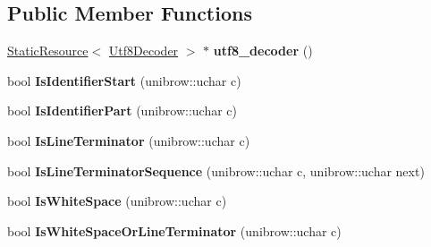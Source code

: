 \subsection*{Public Member Functions}
\begin{DoxyCompactItemize}
\item 
\hyperlink{classv8_1_1internal_1_1_static_resource}{Static\+Resource}$<$ \hyperlink{classunibrow_1_1_utf8_decoder}{Utf8\+Decoder} $>$ $\ast$ {\bfseries utf8\+\_\+decoder} ()\hypertarget{classv8_1_1internal_1_1_unicode_cache_a7cb5b1e10aabf0f2cfeb19ea98d21ef5}{}\label{classv8_1_1internal_1_1_unicode_cache_a7cb5b1e10aabf0f2cfeb19ea98d21ef5}

\item 
bool {\bfseries Is\+Identifier\+Start} (unibrow\+::uchar c)\hypertarget{classv8_1_1internal_1_1_unicode_cache_a63de14e7920c22f85edaa4b09184d110}{}\label{classv8_1_1internal_1_1_unicode_cache_a63de14e7920c22f85edaa4b09184d110}

\item 
bool {\bfseries Is\+Identifier\+Part} (unibrow\+::uchar c)\hypertarget{classv8_1_1internal_1_1_unicode_cache_a13c172d7080d40693cb3a130cad8d599}{}\label{classv8_1_1internal_1_1_unicode_cache_a13c172d7080d40693cb3a130cad8d599}

\item 
bool {\bfseries Is\+Line\+Terminator} (unibrow\+::uchar c)\hypertarget{classv8_1_1internal_1_1_unicode_cache_a3c47629a8b6d7eb07c0b30466ec4f62a}{}\label{classv8_1_1internal_1_1_unicode_cache_a3c47629a8b6d7eb07c0b30466ec4f62a}

\item 
bool {\bfseries Is\+Line\+Terminator\+Sequence} (unibrow\+::uchar c, unibrow\+::uchar next)\hypertarget{classv8_1_1internal_1_1_unicode_cache_a94588a182111e7e98481f18b5681b65c}{}\label{classv8_1_1internal_1_1_unicode_cache_a94588a182111e7e98481f18b5681b65c}

\item 
bool {\bfseries Is\+White\+Space} (unibrow\+::uchar c)\hypertarget{classv8_1_1internal_1_1_unicode_cache_a4571602ee6cc8f874da96783d33020c3}{}\label{classv8_1_1internal_1_1_unicode_cache_a4571602ee6cc8f874da96783d33020c3}

\item 
bool {\bfseries Is\+White\+Space\+Or\+Line\+Terminator} (unibrow\+::uchar c)\hypertarget{classv8_1_1internal_1_1_unicode_cache_a4d39d01fa0f8c958d9e1112a345a3ad0}{}\label{classv8_1_1internal_1_1_unicode_cache_a4d39d01fa0f8c958d9e1112a345a3ad0}

\end{DoxyCompactItemize}
